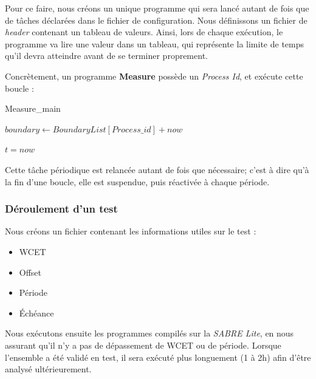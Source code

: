 	Pour ce faire, nous créons un unique programme qui sera lancé autant de fois que de tâches déclarées 
	dans le fichier de configuration. 
	Nous définissons un fichier de \textit{header} contenant un tableau de valeurs. 
	Ainsi, lors de chaque exécution, le programme va lire une valeur dans un tableau, qui représente la 
	limite de temps qu'il devra atteindre avant de se terminer proprement.\newline
	
	Concrètement, un programme \textbf{Measure} possède un \textit{Process Id}, et exécute cette boucle :

	\label{algomeasure}
	\begin{algorithm}[H]
		\caption{Measure\_main}
		\begin{algorithmic}
			\STATE $boundary \leftarrow BoundaryList[Process\_id] + now$
			\REPEAT \item $t = now$
		\end{algorithmic}
	\end{algorithm}

	Cette tâche périodique est relancée autant de fois que nécessaire; c'est à dire qu'à la fin 
	d'une boucle, elle est suspendue, puis réactivée à chaque période.
	
	\subsubsection{Déroulement d'un test}
	Nous créons un fichier contenant les informations utiles sur le test :
	\begin{itemize}
		\item WCET
		\item Offset
		\item Période
		\item Échéance
	\end{itemize}
	Nous exécutons ensuite les programmes compilés sur la \textit{SABRE Lite}, en nous assurant qu'il n'y a pas 
	de dépassement de WCET ou de période. Lorsque l'ensemble a été validé en test, il sera 
	exécuté plus longuement (1 à 2h) afin d'être analysé ultérieurement.\newline

